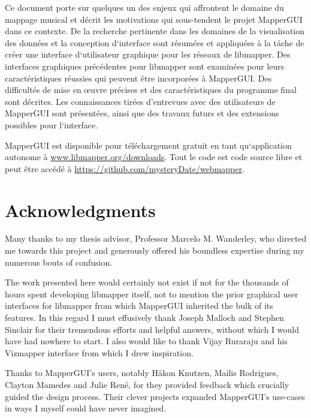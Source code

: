 \documentclass [12pt, letterpaper]{report}
\begin{document}
Ce document porte sur quelques un des enjeux qui affrontent le domaine du mappage musical et d\'ecrit les motivations qui sous-tendent le projet MapperGUI dans ce contexte.
De la recherche pertinente dans les domaines de la visualisation des donn\'ees et la conception d`interface sont r\'esum\'ees et appliqu\'ees \`a la t\^ache de cr\'eer une interface d`utilisateur graphique pour les r\'eseaux de libmapper.
Des interfaces graphiques pr\'ec\'edentes pour libmapper sont examin\'ees pour leurs caract\'eristiques r\'eussies qui peuvent \^etre incorpor\'ees \`a MapperGUI.
Des difficult\'es de mise en \oe uvre pr\'ecises et des caract\'eristiques du programme final sont d\'ecrites.
Les connaissances tir\'ees d’entrevues avec des utilisateurs de MapperGUI sont pr\'esent\'ees, ainsi que des travaux futurs et des extensions possibles pour l`interface.

MapperGUI est disponible pour t\'el\'echargement gratuit en tant qu`application autonome \`a \url{www.libmapper.org/downloads}.
Tout le code est code source libre et peut \^etre acc\'ed\'e \`a \url{https://github.com/mysteryDate/webmapper}.

\pagebreak

\section*{\centering Acknowledgments}

Many thanks to my thesis advisor, Professor Marcelo M. Wanderley, who directed me towards this project and generously offered his boundless expertise during my numerous bouts of confusion.

The work presented here would certainly not exist if not for the thousands of hours spent developing libmapper itself, not to mention the prior graphical user interfaces for libmapper from which MapperGUI inherited the bulk of its features. In this regard I must effusively thank Joseph Malloch and Stephen Sinclair for their tremendous efforts and helpful answers, without which I would have had nowhere to start. I also would like to thank Vijay Ruraraju and his Vizmapper interface from which I drew inspiration.

Thanks to MapperGUI's users, notably H\aa kon Knutzen, Mailis Rodrigues, Clayton Mamedes and Julie Ren\'e, for they provided feedback which crucially guided the design process. Their clever projects expanded MapperGUI's use-cases in ways I myself could have never imagined.
\end{document}
